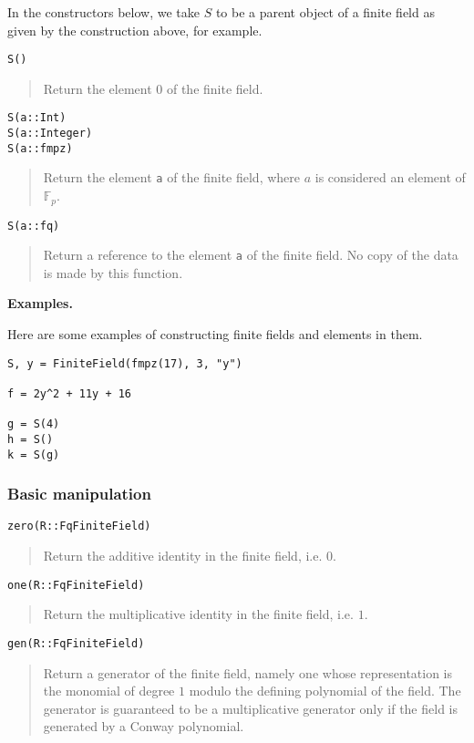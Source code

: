 \documentclass[a4paper,10pt]{article}
\newcommand{\F}{\mathbb{F}}
\newcommand{\code}{\lstinline}
\newcommand{\desc}[1]{\vspace{-3mm}\begin{quote}#1\end{quote}}
\begin{document}
{{In the constructors below, we take $S$ to be a parent object of a finite field
as given by the construction above, for example.

\begin{lstlisting}
S()
\end{lstlisting}

\desc{Return the element $0$ of the finite field.}

\begin{lstlisting}
S(a::Int)
S(a::Integer)
S(a::fmpz)
\end{lstlisting}

\desc{Return the element \code{a} of the finite field, where $a$ is considered 
an element of $\F_p$.}

\begin{lstlisting}
S(a::fq)
\end{lstlisting}

\desc{Return a reference to the element \code{a} of the finite field. No copy
of the data is made by this function.}

\textbf{Examples.}

Here are some examples of constructing finite fields and elements in them.

\begin{lstlisting}
S, y = FiniteField(fmpz(17), 3, "y")

f = 2y^2 + 11y + 16

g = S(4)
h = S()
k = S(g)
\end{lstlisting}

\subsubsection{Basic manipulation}

\begin{lstlisting}
zero(R::FqFiniteField)
\end{lstlisting}

\desc{Return the additive identity in the finite field, i.e. $0$.}

\begin{lstlisting}
one(R::FqFiniteField)
\end{lstlisting}

\desc{Return the multiplicative identity in the finite field, i.e. $1$.}

\begin{lstlisting}
gen(R::FqFiniteField)
\end{lstlisting}

\desc{Return a generator of the finite field, namely one whose
representation is the monomial of degree $1$ modulo the defining
polynomial of the field. The generator is guaranteed to be a multiplicative 
generator only if the field is generated by a Conway polynomial.}

}}
\end{document}
